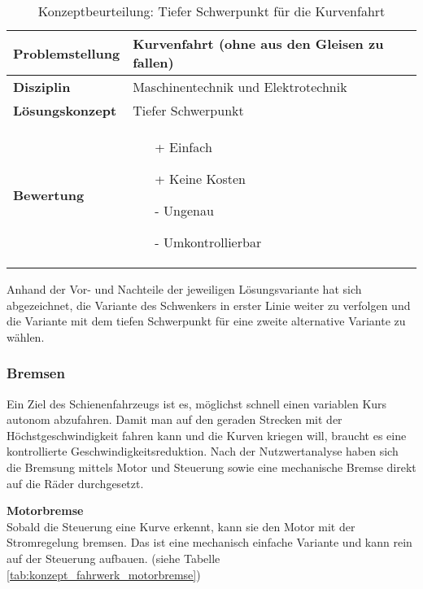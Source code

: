\documentclass[../../main.tex]{subfiles}
\begin{document}
    \begin{flushleft}
        \begin{table}[h]
        \begin{tabular}{ | l | p{11cm} |}
        \hline
        \textbf{Problemstellung} & Kurvenfahrt (ohne aus den Gleisen zu fallen) \\ \hline
        \textbf{Disziplin} & Maschinentechnik und Elektrotechnik \\ \hline
        \textbf{Lösungskonzept} & Tiefer Schwerpunkt \\ \hline
        \textbf{Bewertung} &  \begin{itemize}
                                \item[+] Einfach
                                \item[+] Keine Kosten
                                \item[-] Ungenau 
                                \item[-] Umkontrollierbar 
                              \end{itemize} \\ \hline
        \end{tabular}
        \caption{Konzeptbeurteilung: Tiefer Schwerpunkt für die Kurvenfahrt}
        \label{tab:konzept_fahrwerk_tieferschwerpunkt}
    \end{table}
    \end{flushleft}

    Anhand der Vor- und Nachteile der jeweiligen Lösungsvariante hat sich abgezeichnet, die Variante des Schwenkers in erster Linie weiter zu verfolgen und die Variante mit dem tiefen Schwerpunkt für eine zweite alternative Variante zu wählen.
    
    \subsubsection{Bremsen}
    Ein Ziel des Schienenfahrzeugs ist es, möglichst schnell einen variablen Kurs autonom abzufahren. Damit man auf den geraden Strecken mit der Höchstgeschwindigkeit fahren kann und die Kurven kriegen will, braucht es eine kontrollierte Geschwindigkeitsreduktion. Nach der Nutzwertanalyse haben sich die Bremsung mittels Motor und Steuerung sowie eine mechanische Bremse direkt auf die Räder durchgesetzt.

    \textbf{Motorbremse}\\
    Sobald die Steuerung eine Kurve erkennt, kann sie den Motor mit der Stromregelung bremsen. Das ist eine mechanisch einfache Variante und kann rein auf der Steuerung aufbauen. (siehe Tabelle \ref{tab:konzept_fahrwerk_motorbremse})
\end{document}
